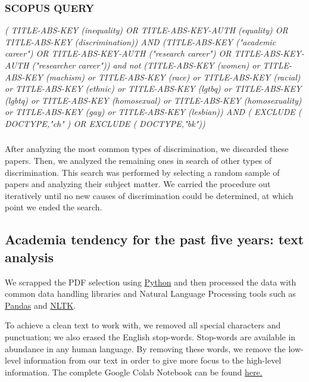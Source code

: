 \documentclass[runningheads]{llncs}
\begin{document}
\subsubsection{SCOPUS QUERY}
\textit{( TITLE-ABS-KEY (inequality) OR TITLE-ABS-KEY-AUTH (equality) OR TITLE-ABS-KEY (discrimination)) AND (TITLE-ABS-KEY ("academic career") OR TITLE-ABS-KEY-AUTH ("research career") OR TITLE-ABS-KEY-AUTH ("researcher career")) and not (TITLE-ABS-KEY (women) or TITLE-ABS-KEY (machism) or TITLE-ABS-KEY (race) or TITLE-ABS-KEY (racial) or TITLE-ABS-KEY (ethnic) or TITLE-ABS-KEY (lgtbq) or TITLE-ABS-KEY (lgbtq) or TITLE-ABS-KEY (homosexual) or TITLE-ABS-KEY (homosexuality) or TITLE-ABS-KEY (gay) or TITLE-ABS-KEY (lesbian)) AND ( EXCLUDE ( DOCTYPE,"ch" ) OR EXCLUDE ( DOCTYPE,"bk"))}

\subsubsection{}
After analyzing the most common types of discrimination, we discarded these papers. Then, we analyzed the remaining ones in search of other types of discrimination. This search was performed by selecting a random sample of papers and analyzing their subject matter. We carried the procedure out iteratively until no new causes of discrimination could be determined, at which point we ended the search. 

\subsection{Academia tendency for the past five years: text analysis}
We scrapped the PDF selection using \href{https://www.python.org/}{Python} and then processed the data with common data handling libraries and Natural Language Processing tools such as \href{https://pandas.pydata.org/}{Pandas} and \href{https://www.nltk.org/}{NLTK}. 

To achieve a clean text to work with, we removed all special characters and punctuation; we also erased the English stop-words. Stop-words are available in abundance in any human language. By removing these words, we remove the low-level information from our text in order to give more focus to the high-level information. The complete Google Colab Notebook can be found  \href{https://colab.research.google.com/drive/1IjIltXAYM-fAM2dUuPyqpsezf4HZf19G?usp=sharing}{here.}
\end{document}
